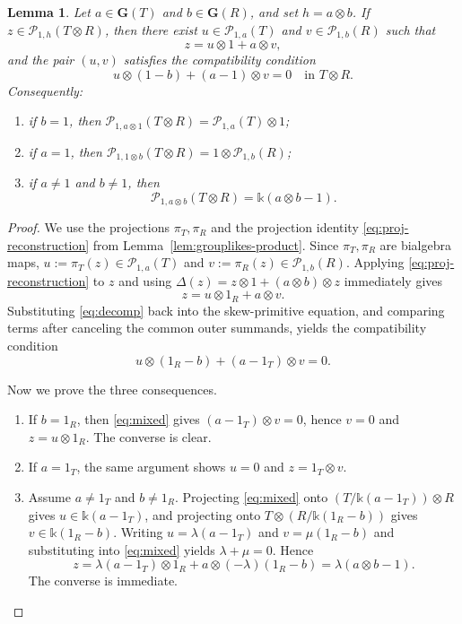 \documentclass[twoside,11pt]{amsart}
\newtheorem{lem}[defi]{Lemma}
\newcommand{\K}{\mathds{k}}
\newcommand{\G}{\mathbf{G}}
\newcommand{\Pp}{\mathcal{P}}
\begin{document}
	\begin{lem}\label{lem:primitive-product}
		Let $a\in\G(T)$ and $b\in\G(R)$, and set $h=a\otimes b$. If
		$z\in\Pp_{1,h}(T\otimes R)$, then there exist
		$u\in\Pp_{1,a}(T)$ and $v\in\Pp_{1,b}(R)$ such that
		\begin{equation}\label{eq:primitive-decomposition}
			z=u\otimes 1+a\otimes v,
		\end{equation}
		and the pair $(u,v)$ satisfies the compatibility condition
		\begin{equation}\label{eq:mixed-primitive-condition}
			u\otimes(1-b)+(a-1)\otimes v=0
			\quad\text{in }T\otimes R.
		\end{equation}
		Consequently:
		\begin{enumerate}
			\item if $b=1$, then
			$\Pp_{1,a\otimes 1}(T\otimes R)=\Pp_{1,a}(T)\otimes 1$;
			\item if $a=1$, then
			$\Pp_{1,1\otimes b}(T\otimes R)=1\otimes\Pp_{1,b}(R)$;
			\item if $a\ne 1$ and $b\ne 1$, then
			\[
			\Pp_{1,a\otimes b}(T\otimes R)=\K(a\otimes b-1).
			\]
		\end{enumerate}
	\end{lem}
	\begin{proof}
		We use the projections $\pi_T,\pi_R$ and the projection identity
		\eqref{eq:proj-reconstruction} from Lemma~\ref{lem:grouplikes-product}.
		Since $\pi_T,\pi_R$ are bialgebra maps,
		$u:=\pi_T(z)\in\mathcal P_{1,a}(T)$ and $v:=\pi_R(z)\in\mathcal P_{1,b}(R)$.
		Applying \eqref{eq:proj-reconstruction} to $z$ and using
		$\Delta(z)=z\otimes 1+(a\otimes b)\otimes z$ immediately gives
		\begin{equation}\label{eq:decomp}
			z=u\otimes 1_R+a\otimes v.
		\end{equation}
		Substituting \eqref{eq:decomp} back into the skew-primitive equation, and
		comparing terms after canceling the common outer summands, yields the
		compatibility condition
		\begin{equation}\label{eq:mixed}
			u\otimes(1_R-b)+(a-1_T)\otimes v=0.
		\end{equation}
		
		Now we prove the three consequences.
		\begin{enumerate}
			\item If $b=1_R$, then \eqref{eq:mixed} gives
			$(a-1_T)\otimes v=0$, hence $v=0$ and $z=u\otimes1_R$.
			The converse is clear.
			\item If $a=1_T$, the same argument shows $u=0$ and
			$z=1_T\otimes v$.
			\item Assume $a\ne1_T$ and $b\ne1_R$. Projecting \eqref{eq:mixed}
			onto $(T/\K(a-1_T))\otimes R$ gives $u\in\K(a-1_T)$, and
			projecting onto $T\otimes(R/\K(1_R-b))$ gives $v\in\K(1_R-b)$.
			Writing $u=\lambda(a-1_T)$ and $v=\mu(1_R-b)$ and substituting
			into \eqref{eq:mixed} yields $\lambda+\mu=0$. Hence
			\[
			z=\lambda(a-1_T)\otimes1_R+a\otimes(-\lambda)(1_R-b)
			=\lambda(a\otimes b-1).
			\]
			The converse is immediate.
		\end{enumerate}
	\end{proof}
\end{document}
